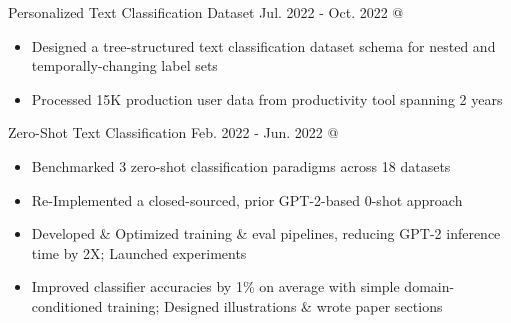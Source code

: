 \cveventSameLine{}
    {Personalized Text Classification Dataset}
    {Jul. 2022 - Oct. 2022}{ @ }
\begin{itemize}
    \item Designed a tree-structured text classification dataset schema for nested and temporally-changing label sets

    \item Processed 15K production user data from  productivity tool spanning 2 years

\end{itemize}
\dividerSmall



\cveventSameLine{}
    {Zero-Shot Text Classification}
    {Feb. 2022 - Jun. 2022}{ @ }
\begin{itemize}

    \item Benchmarked 3 zero-shot classification paradigms across 18 datasets

    \item Re-Implemented a closed-sourced, prior GPT-2-based 0-shot approach

    \item Developed \& Optimized training \& eval pipelines, reducing GPT-2 inference time by 2X; Launched experiments

    \item Improved classifier accuracies by 1\% on average with simple domain-conditioned training; Designed illustrations \& wrote paper sections
\end{itemize}
\dividerSmall


